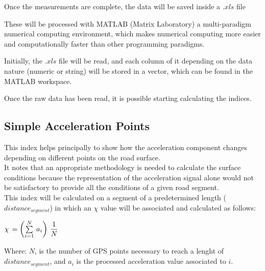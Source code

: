 \documentclass[tesi]{subfiles}
\begin{document}
\noindent Once the measurements are complete, the data will be saved inside a $.xls$ file

\noindent These will be processed with MATLAB (Matrix Laboratory) a multi-paradigm numerical computing environment, which makes numerical computing more easier and computationally faster than other programming paradigms.

\noindent Initially, the $.xls$ file will be read, and each column of it depending on the data nature (numeric or string) will be stored in a vector, which can be found in the MATLAB workspace.

\noindent Once the raw data has been read, it is possible starting calculating the indices.


\subsection{Simple Acceleration Points}\label{ssc:Simple Accelerations Points}
This index helps principally to show how the acceleration component changes depending on different points on the road surface.\\It notes that an appropriate methodology is needed to calculate the surface conditions because the representation of the acceleration signal alone would not be satisfactory to provide all the conditions of a given road segment.\\
This index will be calculated on a segment of a predetermined length ($distance_{segment}$) in which an $\chi$ value will be associated and calculated as follows:

\begin{center}
 $\chi \thinspace = \left( \sum \limits_{i=1}^{N} \thinspace a_{i} \right) \thinspace \dfrac{1}{N}$
\end{center}\label{eq:sap}


\noindent Where: $N$, is the number of GPS points necessary to reach a lenght of $distance_{segment}$, and $a_{i}$ is the processed acceleration value associated to $i$.
\end{document}
